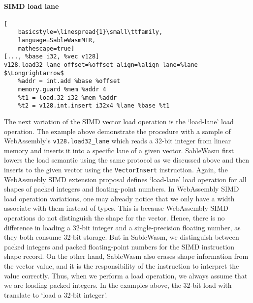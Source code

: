 \paragraph{SIMD load lane} \quad
\begin{lstlisting}[
    basicstyle=\linespread{1}\small\ttfamily, 
    language=SableWasmMIR, 
    mathescape=true]
[..., %base i32, %vec v128]
v128.load32_lane offset=%offset align=%align lane=%lane $\Longrightarrow$
    %addr = int.add %base %offset
    memory.guard %mem %addr 4
    %t1 = load.32 i32 %mem %addr
    %t2 = v128.int.insert i32x4 %lane %base %t1
\end{lstlisting}
The next variation of the SIMD vector load operation is the `load-lane' load
operation. The example above demonstrate the procedure with a sample of
WebAssembly's \texttt{v128.load32\_lane}  which reads a 32-bit integer from
linear memory and inserts it into a specific lane of a given vector. SableWasm
first lowers the load semantic using the same protocol as we discussed above and
then inserts to the given vector using the \texttt{VectorInsert} instruction.
Again, the WebAssmebly SIMD extension proposal defines `load-lane' load
operation for all shapes of packed integers and floating-point numbers. In
WebAssembly SIMD load operation variations, one may already notice that we only
have a width associate with them instead of types. This is because WebAssembly
SIMD operations do not distinguish the shape for the vector. Hence, there is no
difference in loading a 32-bit integer and a single-precision floating number,
as they both consume 32-bit storage. But in SableWasm, we distinguish between
packed integers and packed floating-point numbers for the SIMD instruction shape
record. On the other hand, SableWasm also erases shape information from the
vector value, and it is the responsibility of the instruction to interpret the
value correctly. Thus, when we perform a load operation, we always assume that
we are loading packed integers. In the examples above, the 32-bit load with
translate to `load a 32-bit integer'.

